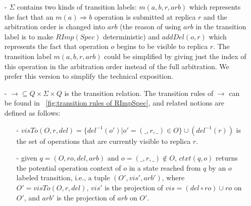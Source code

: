 \begin{itemize}
\item[-] $\Sigma$ contains two kinds of transition labels: $m(a,b,r,\mathit{arb})$ which represents the fact that an $m(a) \Rightarrow b$ operation is submitted at replica $r$ and the arbitration order is changed into $\mathit{arb}$ (the reason of using $\mathit{arb}$ in the transition label is to make $\mathit{RImp}(\mathit{Spec})$ deterministic) and $\mathit{addDel}(o,r)$ which represents the fact that operation $o$ begins to be visible to replica $r$. The transition label $m(a,b,r,\mathit{arb})$ could be simplified by giving just the index of this operation in the arbitration order instead of the full arbitration. We prefer this version to simplify the technical exposition.


\item[-] $\rightarrow \subseteq Q \times \Sigma \times Q$ is the transition relation. The transition rules of $\rightarrow$ can be found in \figurename~\ref{fig:transition rules of RImpSpec}, and related notions are defined as follows:


    \begin {itemize}
    
    \item[-] $\mathit{visTo}(O,r,\mathit{del}) = \{ del^{-1}(o') \vert o'=(\_,r,\_) \in O \} \cup (del^{-1}(r))$ is the set of operations that are currently visible to replica $r$. 


    \item[-] %
      given $q = (O,\mathit{ro},\mathit{del},\mathit{arb})$ and $o=(\_,r,\_) \notin O$, ${\mathit{ctxt}}(q,o)$ returns the potential operation context of $o$ in a state reached from $q$ by an $o$ labeled transition, i.e., a tuple $(O',\mathit{vis}',\mathit{arb}')$, where $O' = \mathit{visTo}(O,r,\mathit{del})$, $\mathit{vis}'$ is the projection of $\mathit{vis}=(\mathit{del}\circ\mathit{ro})\cup\mathit{ro}$ on $O'$, and $\mathit{arb}'$ is the projection of $\mathit{arb}$ on $O'$.


\end{itemize}
\end{itemize}
